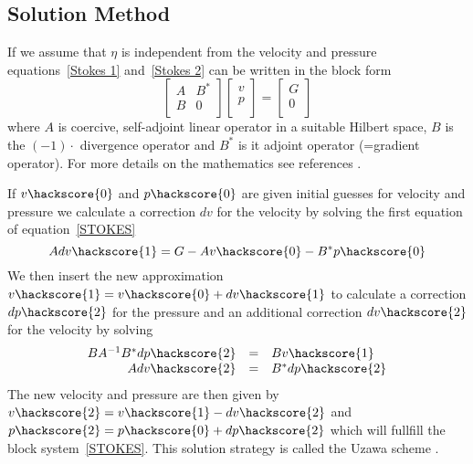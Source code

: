 \subsection{Solution Method \label{STOKES SOLVE}}
If we assume that $\eta$ is independent from the velocity and pressure equations~\ref{Stokes 1} and~\ref{Stokes 2} 
can be written in the block form
\begin{equation}
\left[ \begin{array}{cc}
A     & B^{*} \\
B & 0 \\
\end{array} \right]
\left[ \begin{array}{c}
v \\
p \\
\end{array} \right]
=\left[ \begin{array}{c}
G \\
0 \\
\end{array} \right]
\label{STOKES}
\end{equation}
where $A$ is coercive, self-adjoint linear operator in a suitable Hilbert space, $B$ is the $(-1) \cdot$ divergence operator and $B^{*}$ is it adjoint operator (=gradient operator).
For more details on the mathematics see references \cite{AAMIRBERKYAN2008,MBENZI2005}. 

If $v\hackscore{0}$ and $p\hackscore{0}$ are given initial guesses for
velocity and pressure we calculate a correction $dv$ for the velocity by solving the first
equation of equation~\ref{STOKES}
 \begin{equation}\label{STOKES ITER STEP 1}
 A dv\hackscore{1} = G - A v\hackscore{0} - B^{*} p\hackscore{0}
\end{equation}
We then insert the new approximation $v\hackscore{1}=v\hackscore{0}+dv\hackscore{1}$ to calculate a correction $dp\hackscore{2}$
for the pressure and an additional correction $dv\hackscore{2}$ for the velocity by solving
 \begin{equation}
 \begin{array}{rcl}
 B A^{-1} B^{*} dp\hackscore{2} & = & Bv\hackscore{1} \\
 A dv\hackscore{2} & = & B^{*} dp\hackscore{2} 
\end{array}
 \label{STOKES ITER STEP 2}
 \end{equation}
The new velocity and pressure are then given by $v\hackscore{2}=v\hackscore{1}-dv\hackscore{2}$ and
$p\hackscore{2}=p\hackscore{0}+dp\hackscore{2}$ which will fullfill the block system~\ref{STOKES}. 
This solution strategy is called the Uzawa scheme . 

